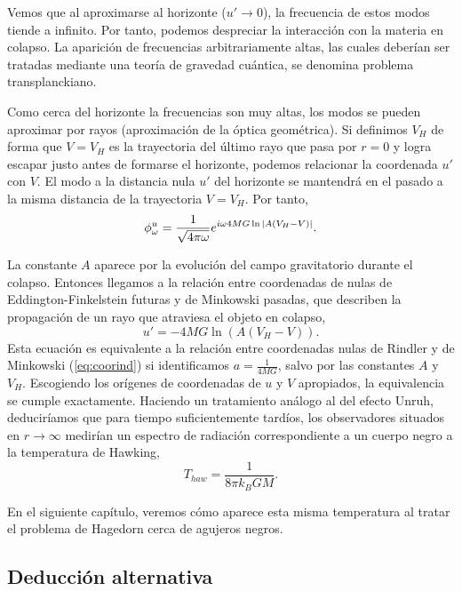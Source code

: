 Vemos que al aproximarse al horizonte ($u'\to 0$), la frecuencia de estos modos tiende a infinito.
Por tanto, podemos despreciar la interacción con la materia en colapso.
La aparición de frecuencias arbitrariamente altas, las cuales deberían ser tratadas mediante
una teoría de gravedad cuántica, se denomina problema transplanckiano.

Como cerca del horizonte la frecuencias son muy altas, los modos se pueden aproximar por rayos (aproximación de la óptica geométrica).
Si definimos $V_H$ de forma que $V=V_H$ es la trayectoria del último rayo que pasa por $r=0$
y logra escapar justo antes de formarse el horizonte, podemos relacionar la coordenada
$u'$ con $V$.
El modo a la distancia nula $u'$ del horizonte se mantendrá en el pasado a la misma distancia de la trayectoria $V=V_H$.
Por tanto,
\begin{equation}
  \phi^{u}_\omega = \frac{1}{\sqrt{4\pi\omega}}e^{i\omega 4MG\ln \abs{A(V_H-V)}}.
\end{equation}

La constante $A$ aparece por la evolución del campo gravitatorio durante el colapso.
Entonces llegamos a la relación entre coordenadas de nulas de Eddington-Finkelstein futuras y de Minkowski pasadas,
que describen la propagación de un rayo que atraviesa el objeto en colapso,
\begin{equation}
  u'=-4MG\ln (A(V_H-V)).
\end{equation}
Esta ecuación es equivalente a la relación entre coordenadas nulas de Rindler y de Minkowski (\ref{eq:coorind}) si identificamos $a=\frac{1}{4MG}$, salvo por las constantes $A$ y $V_H$.
Escogiendo los orígenes de coordenadas de $u$ y $V$ apropiados, la equivalencia se cumple exactamente.
Haciendo un tratamiento análogo al del efecto Unruh, deduciríamos que para tiempo suficientemente tardíos,
los observadores situados en $r\to\infty$ medirían un espectro de radiación correspondiente a un 
cuerpo negro a la temperatura de Hawking,
\begin{equation}
  T_{haw}=\frac{1}{8\pi k_B G M}.
\end{equation}

En el siguiente capítulo, veremos cómo aparece esta misma temperatura al tratar el problema de Hagedorn
cerca de agujeros negros.

\subsection{Deducción alternativa}

